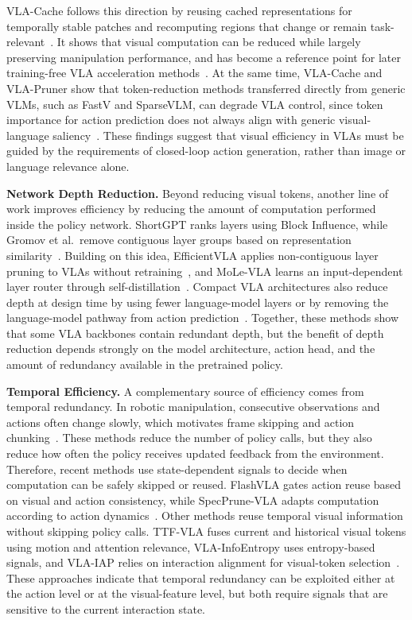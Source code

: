 \documentclass[letterpaper, 10 pt, conference]{ieeeconf}
\begin{document}
VLA-Cache follows this direction by reusing cached representations for temporally stable patches and recomputing regions that change or remain task-relevant~\cite{vlacache}. It shows that visual computation can be reduced while largely preserving manipulation performance, and has become a reference point for later training-free VLA acceleration methods~\cite{vlapruner,efficientvla,specprune}. At the same time, VLA-Cache and VLA-Pruner show that token-reduction methods transferred directly from generic VLMs, such as FastV and SparseVLM, can degrade VLA control, since token importance for action prediction does not always align with generic visual-language saliency~\cite{fastv,sparsevlm,vlacache,vlapruner}. These findings suggest that visual efficiency in VLAs must be guided by the requirements of closed-loop action generation, rather than image or language relevance alone.

\noindent\textbf{Network Depth Reduction.}
Beyond reducing visual tokens, another line of work improves efficiency by reducing the amount of computation performed inside the policy network. ShortGPT ranks layers using Block Influence, while Gromov et al.\ remove contiguous layer groups based on representation similarity~\cite{shortgpt,gromov}. Building on this idea, EfficientVLA applies non-contiguous layer pruning to VLAs without retraining~\cite{efficientvla}, and MoLe-VLA learns an input-dependent layer router through self-distillation~\cite{molevla}. Compact VLA architectures also reduce depth at design time by using fewer language-model layers or by removing the language-model pathway from action prediction~\cite{flower,smolvla,turbovla}. Together, these methods show that some VLA backbones contain redundant depth, but the benefit of depth reduction depends strongly on the model architecture, action head, and the amount of redundancy available in the pretrained policy.

\noindent\textbf{Temporal Efficiency.}
A complementary source of efficiency comes from temporal redundancy. In robotic manipulation, consecutive observations and actions often change slowly, which motivates frame skipping and action chunking~\cite{dqn,act,diffusionpolicy,openvlaoft}. These methods reduce the number of policy calls, but they also reduce how often the policy receives updated feedback from the environment. Therefore, recent methods use state-dependent signals to decide when computation can be safely skipped or reused. FlashVLA gates action reuse based on visual and action consistency, while SpecPrune-VLA adapts computation according to action dynamics~\cite{flashvla,specprune}. Other methods reuse temporal visual information without skipping policy calls. TTF-VLA fuses current and historical visual tokens using motion and attention relevance, VLA-InfoEntropy uses entropy-based signals, and VLA-IAP relies on interaction alignment for visual-token selection~\cite{ttfvla,vlainfoentropy,vlaiap}. These approaches indicate that temporal redundancy can be exploited either at the action level or at the visual-feature level, but both require signals that are sensitive to the current interaction state.
\end{document}
